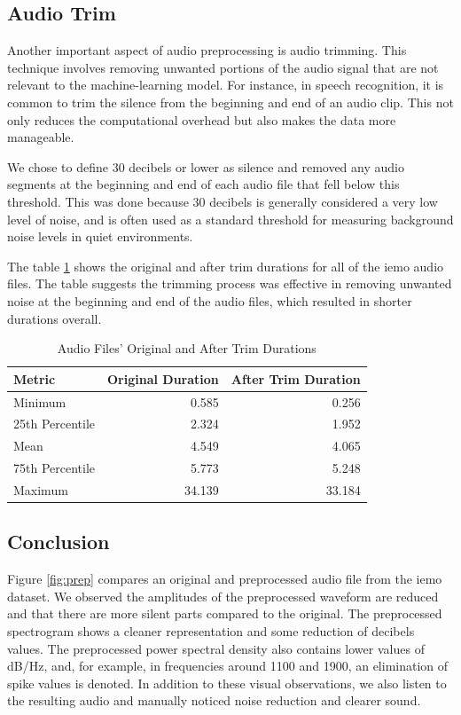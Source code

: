 \subsection{Audio Trim}

Another important aspect of audio preprocessing is audio trimming. This technique involves removing unwanted portions of the audio signal that are not relevant to the machine-learning model. For instance, in speech recognition, it is common to trim the silence from the beginning and end of an audio clip. This not only reduces the computational overhead but also makes the data more manageable.

We chose to define 30 decibels or lower as silence and removed any audio segments at the beginning and end of each audio file that fell below this threshold. This was done because 30 decibels is generally considered a very low level of noise, and is often used as a standard threshold for measuring background noise levels in quiet environments.

The table \ref{trim_durations} shows the original and after trim durations for all of the \ac{iemo} audio files. The table suggests the trimming process was effective in removing unwanted noise at the beginning and end of the audio files, which resulted in shorter durations overall. 


\begin{table}[H]
	\centering
	\caption{Audio Files' Original and After Trim Durations}
	\label{trim_durations}
	\begin{tabular}{lrr}
		\toprule
		Metric & Original Duration & After Trim Duration \\
		\midrule
		Minimum  		&  0.585 	&  0.256 \\
		25th Percentile &  2.324	&  1.952 \\
		Mean 			&  4.549  	&  4.065 \\
		75th Percentile	&  5.773	&  5.248 \\
		Maximum 		& 34.139   	& 33.184 \\
		\bottomrule
	\end{tabular}
\end{table}



\subsection{Conclusion}

Figure \ref{fig:prep} compares an original and preprocessed audio file from the \ac{iemo} dataset. We observed the amplitudes of the preprocessed waveform are reduced and that there are more silent parts compared to the original. The preprocessed spectrogram shows a cleaner representation and some reduction of decibels values. The preprocessed power spectral density also contains lower values of dB/Hz, and, for example, in frequencies around 1100 and 1900, an elimination of spike values is denoted. In addition to these visual observations, we also listen to the resulting audio and manually noticed noise reduction and clearer sound.

